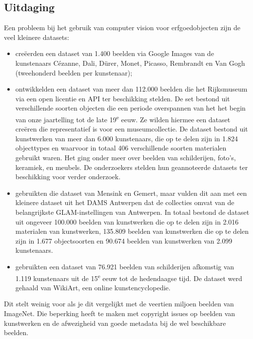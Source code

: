 \subsection{Uitdaging}
\label{subsec:cv-voor-ce-uitdaging}

Een probleem bij het gebruik van computer vision voor erfgoedobjecten zijn de veel kleinere datasets: 
\begin{itemize}
	\item \textcite{Blessings2013} cre\"{e}erden een dataset van 1.400 beelden via Google Images van de kunstenaars C\'{e}zanne, Dali, D\"{u}rer, Monet, Picasso, Rembrandt en Van Gogh (tweehonderd beelden per kunstenaar);
	\item \textcite{Mensink2014} ontwikkelden een dataset van meer dan 112.000 beelden die het Rijksmuseum via een open licentie en API ter beschikking stelden. De set bestond uit verschillende soorten objecten die een periode overspannen van het het begin van onze jaartelling tot de late 19\textsuperscript{e} eeuw. Ze wilden hiermee een dataset cre\"{e}ren die representatief is voor een museumcollectie. De dataset bestond uit kunstwerken van meer dan 6.000 kunstenaars, die op te delen zijn in 1.824 objecttypes en waarvoor in totaal 406 verschillende soorten materialen gebruikt waren. Het ging onder meer over beelden van schilderijen, foto’s, keramiek, en meubels. De onderzoekers stelden hun geannoteerde datasets ter beschikking voor verder onderzoek.
	\item \textcite{Sabatteli2018} gebruikten die dataset van Mensink en Gemert, maar vulden dit aan met een kleinere dataset uit het DAMS Antwerpen dat de collecties omvat van de belangrijkste GLAM-instellingen van Antwerpen. In totaal bestond de dataset uit ongeveer 100.000 beelden van kunstwerken die op te delen zijn in 2.016 materialen van kunstwerken, 135.809 beelden van kunstwerken die op te delen zijn in 1.677 objectsoorten en 90.674 beelden van kunstwerken van 2.099 kunstenaars.
	\item \textcite{Elgammal2018} gebruikten een dataset van 76.921 beelden van schilderijen afkomstig van 1.119 kunstenaars uit de 15\textsuperscript{e} eeuw tot de hedendaagse tijd.  De dataset werd gehaald van WikiArt, een online kunstencyclopedie.
\end{itemize}

Dit stelt weinig voor als je dit vergelijkt met de veertien miljoen beelden van ImageNet. Die beperking heeft te maken met copyright issues op beelden van kunstwerken en de afwezigheid van goede metadata bij de wel beschikbare beelden. 

